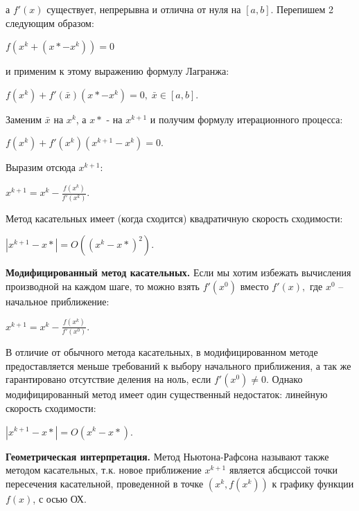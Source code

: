 \documentclass{article}
\begin{document}
				а $f'(x)$ существует, непрерывна и отлична от нуля на $[a,b]$. 
				Перепишем 2 следующим образом:
				
				\begin{center}$f(x^k+(x*-x^k))=0$
				\end{center}
				
и применим к этому выражению формулу Лагранжа:

				\begin{center}$f(x^k)+f'(\bar{x})(x*-x^k)=0, \;\bar{x} \in [a,b].$\end{center}
				
				Заменим $ \bar x$ на $x^k$, а $x*$ - на $x^{k+1}$ и получим формулу итерационного процесса:
				
				\begin{center}$f(x^k)+f'(x^k)(x^{k+1}-x^k)=0.$\end{center}
				
				Выразим отсюда $x^{k+1}$:
				
				\begin{center}$x^{k+1}=x^k-\frac{f(x^k)}{f'(x^k)}.$\end{center}

				Метод касательных имеет (когда сходится) квадратичную скорость сходимости: \begin{center}$|x^{k+1}-x*|=O((x^k-x*)^2).$\end{center}

				\textbf{Модифицированный метод касательных.}
				Если мы хотим избежать вычисления производной на каждом шаге, то можно взять $ f'(x^0)$ вместо $f'(x),$ где $x^0$ -- начальное приближение:
				
				\begin{center}$x^{k+1}=x^k-\frac{f(x^k)}{f'(x^0)}.$\end{center}
				
				В отличие от обычного метода касательных, в модифицированном методе предоставляется меньше требований к выбору начального приближения, а так же гарантировано отсутствие деления на ноль, если $f'(x^0) \ne 0.$
				Однако модифицированный метод имеет один существенный недостаток: линейную скорость сходимости: 
				
				\begin{center}$|x^{k+1}-x*|=O(x^k-x*).$\end{center}

				\textbf{Геометрическая интерпретация.}
				Метод Ньютона-Рафсона называют также методом касательных, т.к. новое приближение $x^{k+1}$ является абсциссой точки пересечения касательной, проведенной в точке $(x^k,f(x^k))$ к графику функции $f(x)$, с осью ОХ.
				
\end{document}
